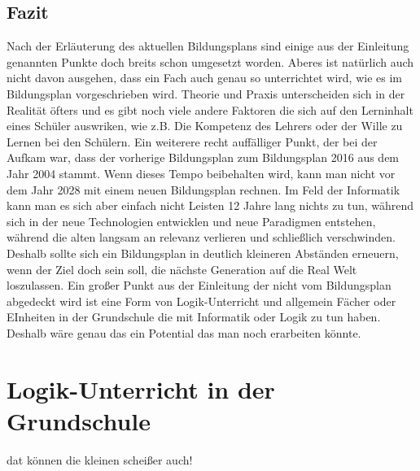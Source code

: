 \subsection{Fazit}
Nach der Erläuterung des aktuellen Bildungsplans sind einige aus der Einleitung genannten Punkte doch breits schon umgesetzt worden. Aberes ist natürlich auch nicht davon ausgehen, dass ein Fach auch genau so unterrichtet wird, wie es im Bildungsplan vorgeschrieben wird. Theorie und Praxis unterscheiden sich in der Realität öfters und es gibt noch viele andere Faktoren die sich auf den Lerninhalt eines Schüler auswriken, wie z.B. Die Kompetenz des Lehrers oder der Wille zu Lernen bei den Schülern. Ein weiterere recht auffälliger Punkt, der bei der Aufkam war, dass der vorherige Bildungsplan zum Bildungsplan 2016 aus dem Jahr 2004 stammt. Wenn dieses Tempo beibehalten wird, kann man nicht vor dem Jahr 2028 mit einem neuen Bildungsplan rechnen. Im Feld der Informatik kann man es sich aber einfach nicht Leisten 12 Jahre lang nichts zu tun, während sich in der neue Technologien entwicklen und neue Paradigmen entstehen, während die alten langsam an relevanz verlieren und schließlich verschwinden. Deshalb sollte sich ein Bildungsplan in deutlich kleineren Abständen erneuern, wenn der Ziel doch sein soll, die nächste Generation auf die Real Welt loszulassen. Ein großer Punkt aus der Einleitung der nicht vom Bildungsplan abgedeckt wird ist eine Form von Logik-Unterricht und allgemein Fächer oder EInheiten in der Grundschule die mit Informatik oder Logik zu tun haben. Deshalb wäre genau das ein Potential das man noch erarbeiten könnte.

\section{Logik-Unterricht in der Grundschule}
dat können die kleinen scheißer auch!